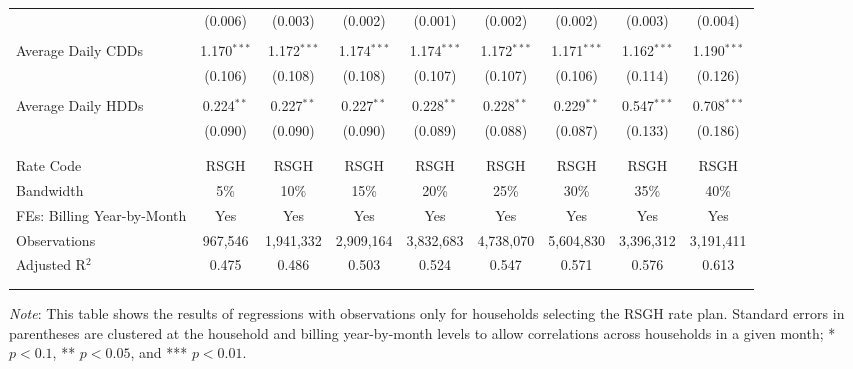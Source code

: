 {\begin{table}[t!]
\begin{adjustbox}{scale = 0.72}
\begin{threeparttable}
\begin{tabular}{@{\extracolsep{5pt}}lcccccccc}
                    & (0.006) & (0.003) & (0.002) & (0.001) & (0.002) & (0.002) & (0.003) & (0.004) \\ 
                    & & & & & & & & \\ 
                    Average Daily CDDs & 1.170$^{***}$ & 1.172$^{***}$ & 1.174$^{***}$ & 1.174$^{***}$ & 1.172$^{***}$ & 1.171$^{***}$ & 1.162$^{***}$ & 1.190$^{***}$ \\ 
                    & (0.106) & (0.108) & (0.108) & (0.107) & (0.107) & (0.106) & (0.114) & (0.126) \\ 
                    & & & & & & & & \\ 
                    Average Daily HDDs & 0.224$^{**}$ & 0.227$^{**}$ & 0.227$^{**}$ & 0.228$^{**}$ & 0.228$^{**}$ & 0.229$^{**}$ & 0.547$^{***}$ & 0.708$^{***}$ \\ 
                    & (0.090) & (0.090) & (0.090) & (0.089) & (0.088) & (0.087) & (0.133) & (0.186) \\ 
                    & & & & & & & & \\
                    \hline
                    \\[-2.0ex]
                    Rate Code & RSGH & RSGH & RSGH & RSGH & RSGH & RSGH & RSGH & RSGH \\ 
                    Bandwidth & 5\% & 10\% & 15\% & 20\% & 25\% & 30\% & 35\% & 40\% \\ 
                    FEs: Billing Year-by-Month & Yes & Yes & Yes & Yes & Yes & Yes & Yes & Yes \\ 
                    Observations & 967,546 & 1,941,332 & 2,909,164 & 3,832,683 & 4,738,070 & 5,604,830 & 3,396,312 & 3,191,411 \\ 
                    Adjusted R$^{2}$ & 0.475 & 0.486 & 0.503 & 0.524 & 0.547 & 0.571 & 0.576 & 0.613 \\
                    \\[-2.0ex]
                    \hline \hline
                    \\[-4.5ex]
                \end{tabular}
                \begin{tablenotes}[flushleft]
                    \footnotesize
                    \item \textit{Note}: This table shows the results of regressions with observations only for households selecting the RSGH rate plan. Standard errors in parentheses are clustered at the household and billing year-by-month levels to allow correlations across households in a given month; * $p < 0.1$, ** $p < 0.05$, and *** $p < 0.01$.
                \end{tablenotes}
            \end{threeparttable}
        \end{adjustbox}
    \end{table}
}
